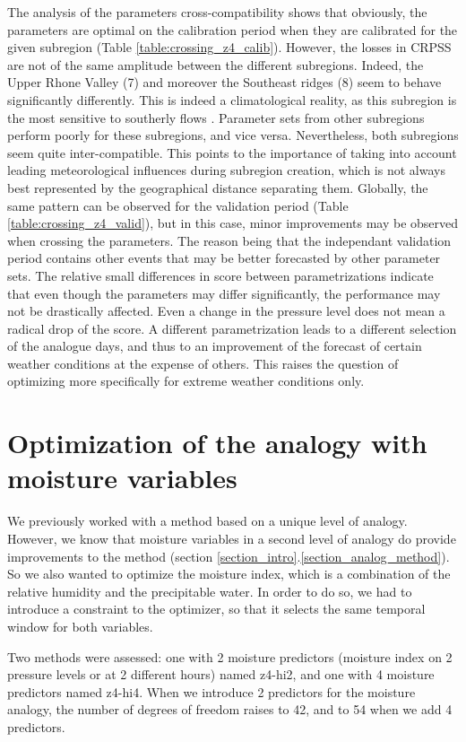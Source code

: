 \documentclass{ametsoc}
\begin{document}
The analysis of the parameters cross-compatibility shows that obviously, the parameters are optimal on the calibration period when they are calibrated for the given subregion (Table \ref{table:crossing_z4_calib}). However, the losses in CRPSS are not of the same amplitude between the different subregions. Indeed, the Upper Rhone Valley (7) and moreover the Southeast ridges (8) seem to behave significantly differently. This is indeed a climatological reality, as this subregion is the most sensitive to southerly flows \citep{Horton2012}. Parameter sets from other subregions perform poorly for these subregions, and vice versa. Nevertheless, both subregions seem quite inter-compatible. This points to the importance of taking into account leading meteorological influences during subregion creation, which is not always best represented by the geographical distance separating them. Globally, the same pattern can be observed for the validation period (Table \ref{table:crossing_z4_valid}), but in this case, minor improvements may be observed when crossing the parameters. The reason being that the independant validation period contains other events that may be better forecasted by other parameter sets. The relative small differences in score between parametrizations indicate that even though the parameters may differ significantly, the performance may not be drastically affected. Even a change in the pressure level does not mean a radical drop of the score. A different parametrization leads to a different selection of the analogue days, and thus to an improvement of the forecast of certain weather conditions at the expense of others. This raises the question of optimizing more specifically for extreme weather conditions only. 
 

\section{Optimization of the analogy with moisture variables}

We previously worked with a method based on a unique level of analogy. However, we know that moisture variables in a second level of analogy do provide improvements to the method (section \ref{section_intro}.\ref{section_analog_method}). So we also wanted to optimize the moisture index, which is a combination of the relative humidity and the precipitable water. In order to do so, we had to introduce a constraint to the optimizer, so that it selects the same temporal window for both variables. 

Two methods were assessed: one with 2 moisture predictors (moisture index on 2 pressure levels or at 2 different hours) named z4-hi2, and one with 4 moisture predictors named z4-hi4. When we introduce 2 predictors for the moisture analogy, the number of degrees of freedom raises to 42, and to 54 when we add 4 predictors.
\end{document}
